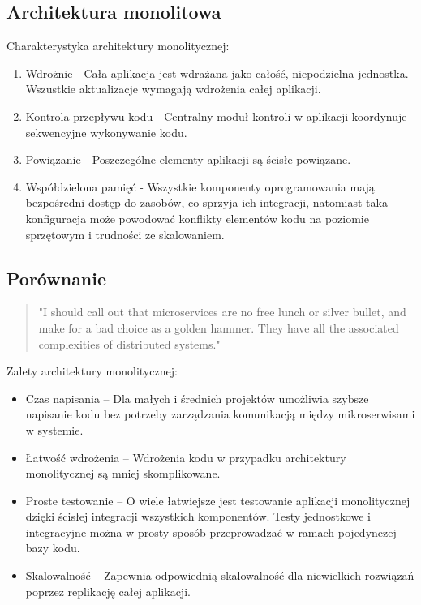\documentclass[runningheads,12pt]{llncs}
\begin{document}
\subsection{Architektura monolitowa}

Charakterystyka architektury monolitycznej:

\begin{enumerate}
    \item Wdrożnie - Cała aplikacja jest wdrażana jako całość, niepodzielna jednostka. Wszustkie aktualizacje wymagają wdrożenia całej aplikacji.
    \item Kontrola przepływu kodu - Centralny moduł kontroli w aplikacji koordynuje sekwencyjne wykonywanie kodu.
    \item Powiązanie - Poszczególne elementy aplikacji są ścisłe powiązane.
    \item Współdzielona pamięć - Wszystkie komponenty oprogramowania mają bezpośredni dostęp do zasobów, co sprzyja ich integracji, natomiast taka konfiguracja może powodować konflikty elementów kodu na poziomie sprzętowym i trudności ze skalowaniem. \cite{sharma2023monolithic}
\end{enumerate}

\subsection{Porównanie}

\begin{quote}
    "I should call out that microservices are no free lunch or silver bullet, and make for a bad choice as a golden hammer. They have all the associated complexities of distributed systems."~\cite[p. 11]{newman2015building}
\end{quote}

Zalety architektury monolitycznej:

\begin{itemize}
    \item Czas napisania – Dla małych i średnich projektów umożliwia szybsze napisanie kodu bez potrzeby zarządzania komunikacją między mikroserwisami w systemie.
    \item Łatwość wdrożenia – Wdrożenia kodu w przypadku architektury monolitycznej są mniej skomplikowane.
    \item Proste testowanie – O wiele łatwiejsze jest testowanie aplikacji monolitycznej dzięki ścisłej integracji wszystkich komponentów. Testy jednostkowe i integracyjne można w prosty sposób przeprowadzać w ramach pojedynczej bazy kodu.
    \item Skalowalność – Zapewnia odpowiednią skalowalność dla niewielkich rozwiązań poprzez replikację całej aplikacji.
\end{itemize}
\end{document}
